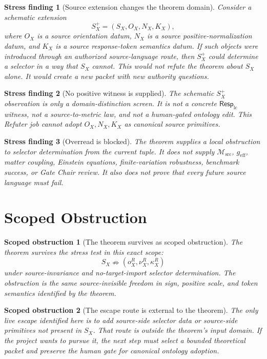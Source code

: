 \documentclass[11pt]{article}
\newcommand{\Msrc}{\mathcal{M}_{\mathrm{src}}}
\newcommand{\RespLC}{\mathsf{Resp}_{\mathrm{lc}}}
\newcommand{\geff}{g_{\mathrm{eff}}}
\newtheorem{stressfinding}{Stress finding}
\newtheorem{obstruction}{Scoped obstruction}
\begin{document}
\begin{stressfinding}[Source extension changes the theorem domain]
Consider a schematic extension
\[
    S_X^+=(S_X,O_X,N_X,K_X),
\]
where \(O_X\) is a source orientation datum, \(N_X\) is a source
positive-normalization datum, and \(K_X\) is a source response-token
semantics datum. If such objects were introduced through an authorized
source-language route, then \(S_X^+\) could determine a selector in a
way that \(S_X\) cannot. This would not refute the theorem about
\(S_X\) alone. It would create a new packet with new authority
questions.
\end{stressfinding}

\begin{stressfinding}[No positive witness is supplied]
The schematic \(S_X^+\) observation is only a domain-distinction
screen. It is not a concrete \(\RespLC\) witness, not a source-to-metric
law, and not a human-gated ontology edit. This Refuter job cannot
adopt \(O_X,N_X,K_X\) as canonical source primitives.
\end{stressfinding}

\begin{stressfinding}[Overread is blocked]
The theorem supplies a local obstruction to selector determination
from the current tuple. It does not supply \(\Msrc\), \(\geff\),
matter coupling, Einstein equations, finite-variation robustness,
benchmark success, or Gate Chair review. It also does not prove that
every future source language must fail.
\end{stressfinding}

\section{Scoped Obstruction}

\begin{obstruction}[The theorem survives as scoped obstruction]
The theorem survives the stress test in this exact scope:
\[
    S_X \nRightarrow (o^R_X,\nu^R_X,\kappa^R_X)
\]
under source-invariance and no-target-import selector determination.
The obstruction is the same source-invisible freedom in sign, positive
scale, and token semantics identified by the theorem.
\end{obstruction}

\begin{obstruction}[The escape route is external to the theorem]
The only live escape identified here is to add source-side selector
data or source-side primitives not present in \(S_X\). That route is
outside the theorem's input domain. If the project wants to pursue it,
the next step must select a bounded theoretical packet and preserve
the human gate for canonical ontology adoption.
\end{obstruction}
\end{document}

